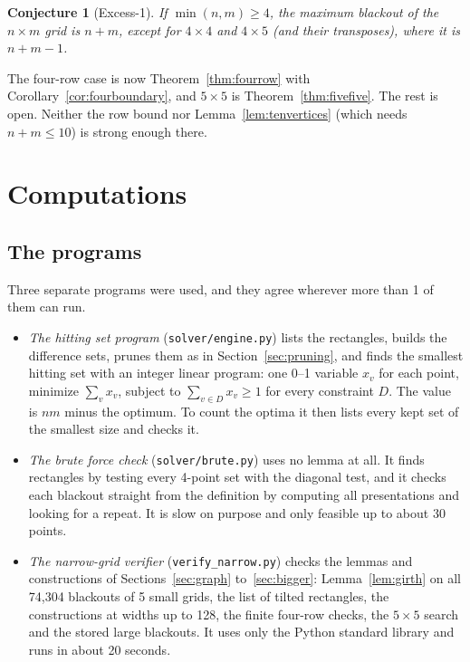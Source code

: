 \documentclass[11pt]{article}
\newtheorem{conjecture}[theorem]{Conjecture}
\theoremstyle{definition}
\theoremstyle{remark}
\begin{document}
\begin{conjecture}[Excess-1]\label{conj:excess}
If $\min(n,m)\ge4$, the maximum blackout of the $n\times m$ grid is $n+m$, except for $4\times4$
and $4\times5$ (and their transposes), where it is $n+m-1$.
\end{conjecture}

The four-row case is now Theorem~\ref{thm:fourrow} with Corollary~\ref{cor:fourboundary}, and
$5\times5$ is Theorem~\ref{thm:fivefive}. The rest is open. Neither the row bound nor
Lemma~\ref{lem:tenvertices} (which needs $n+m\le10$) is strong enough there.

\section{Computations}\label{sec:computations}

\subsection{The programs}

Three separate programs were used, and they agree wherever more than 1 of them can run.
\begin{itemize}[leftmargin=*,itemsep=1pt]
\item \emph{The hitting set program} (\texttt{solver/engine.py}) lists the rectangles, builds the
difference sets, prunes them as in Section~\ref{sec:pruning}, and finds the smallest hitting set
with an integer linear program: one 0--1 variable $x_v$ for each point, minimize $\sum_vx_v$,
subject to $\sum_{v\in D}x_v\ge1$ for every constraint $D$. The value is $nm$ minus the optimum.
To count the optima it then lists every kept set of the smallest size and checks it.
\item \emph{The brute force check} (\texttt{solver/brute.py}) uses no lemma at all. It finds
rectangles by testing every 4-point set with the diagonal test, and it checks each blackout
straight from the definition by computing all presentations and looking for a repeat. It is slow
on purpose and only feasible up to about 30 points.
\item \emph{The narrow-grid verifier} (\texttt{verify\_narrow.py}) checks the lemmas and
constructions of Sections~\ref{sec:graph} to~\ref{sec:bigger}: Lemma~\ref{lem:girth} on all
74,304 blackouts of 5 small grids, the list of tilted rectangles, the constructions at widths up
to 128, the finite four-row checks, the $5\times5$ search and the stored large blackouts. It uses
only the Python standard library and runs in about 20 seconds.
\end{itemize}
\end{document}

